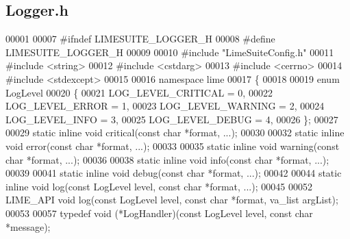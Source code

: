 \subsection{Logger.\+h}
\label{limesuite-dev_2src_2Logger_8h_source}

\begin{DoxyCode}
00001 
00007 \textcolor{preprocessor}{#ifndef LIMESUITE\_LOGGER\_H}
00008 \textcolor{preprocessor}{#define LIMESUITE\_LOGGER\_H}
00009 
00010 \textcolor{preprocessor}{#include "LimeSuiteConfig.h"}
00011 \textcolor{preprocessor}{#include <string>}
00012 \textcolor{preprocessor}{#include <cstdarg>}
00013 \textcolor{preprocessor}{#include <cerrno>}
00014 \textcolor{preprocessor}{#include <stdexcept>}
00015 
00016 \textcolor{keyword}{namespace }lime
00017 \{
00018 
00019 \textcolor{keyword}{enum} LogLevel
00020 \{
00021     LOG_LEVEL_CRITICAL = 0, 
00022     LOG_LEVEL_ERROR    = 1, 
00023     LOG_LEVEL_WARNING  = 2, 
00024     LOG_LEVEL_INFO     = 3, 
00025     LOG_LEVEL_DEBUG    = 4, 
00026 \};
00027 
00029 \textcolor{keyword}{static} \textcolor{keyword}{inline} \textcolor{keywordtype}{void} critical(\textcolor{keyword}{const} \textcolor{keywordtype}{char} *format, ...);
00030 
00032 \textcolor{keyword}{static} \textcolor{keyword}{inline} \textcolor{keywordtype}{void} error(\textcolor{keyword}{const} \textcolor{keywordtype}{char} *format, ...);
00033 
00035 \textcolor{keyword}{static} \textcolor{keyword}{inline} \textcolor{keywordtype}{void} warning(\textcolor{keyword}{const} \textcolor{keywordtype}{char} *format, ...);
00036 
00038 \textcolor{keyword}{static} \textcolor{keyword}{inline} \textcolor{keywordtype}{void} info(\textcolor{keyword}{const} \textcolor{keywordtype}{char} *format, ...);
00039 
00041 \textcolor{keyword}{static} \textcolor{keyword}{inline} \textcolor{keywordtype}{void} debug(\textcolor{keyword}{const} \textcolor{keywordtype}{char} *format, ...);
00042 
00044 \textcolor{keyword}{static} \textcolor{keyword}{inline} \textcolor{keywordtype}{void} log(\textcolor{keyword}{const} LogLevel level, \textcolor{keyword}{const} \textcolor{keywordtype}{char} *format, ...);
00045 
00052 LIME_API \textcolor{keywordtype}{void} log(\textcolor{keyword}{const} LogLevel level, \textcolor{keyword}{const} \textcolor{keywordtype}{char} *format, va\_list argList);
00053 
00057 \textcolor{keyword}{typedef} void (*LogHandler)(\textcolor{keyword}{const} LogLevel level, \textcolor{keyword}{const} \textcolor{keywordtype}{char} *message);

\end{DoxyCode}
